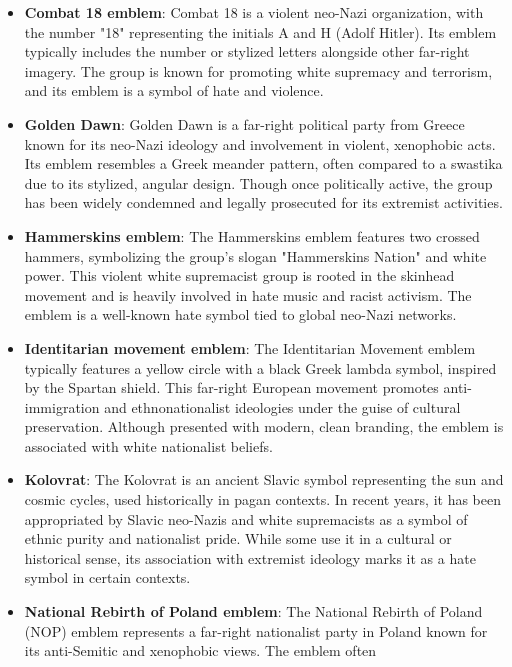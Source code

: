 \begin{itemize}
  symbol, white supremacists have adopted a simplified version as a symbol of white
  identity and nationalism. This version is now widely recognized as a hate symbol
  in extremist contexts.
  \item \textbf{Combat 18 emblem}: Combat 18 is a violent neo-Nazi organization, with the
  number "18" representing the initials A and H (Adolf Hitler). Its emblem typically
  includes the number or stylized letters alongside other far-right imagery. The group
  is known for promoting white supremacy and terrorism, and its emblem is a symbol of
  hate and violence.
  \item \textbf{Golden Dawn}: Golden Dawn is a far-right political party from Greece known for its neo-Nazi ideology
  and involvement in violent, xenophobic acts. Its emblem resembles a Greek meander pattern, often compared to a
  swastika due to its stylized, angular design. Though once politically active, the group has been widely condemned
  and legally prosecuted for its extremist activities.
  \item \textbf{Hammerskins emblem}: The Hammerskins emblem features two crossed hammers, symbolizing the group's
  slogan "Hammerskins Nation" and white power. This violent white supremacist group is rooted in the skinhead
  movement and is heavily involved in hate music and racist activism. The emblem is a well-known hate symbol tied to
  global neo-Nazi networks.
  \item \textbf{Identitarian movement emblem}: The Identitarian Movement emblem typically features a yellow circle
  with a black Greek lambda symbol, inspired by the Spartan shield. This far-right European movement promotes
  anti-immigration and ethnonationalist ideologies under the guise of cultural preservation. Although presented with
  modern, clean branding, the emblem is associated with white nationalist beliefs.
  \item \textbf{Kolovrat}: The Kolovrat is an ancient Slavic symbol representing the sun and cosmic cycles, used
  historically in pagan contexts. In recent years, it has been appropriated by Slavic neo-Nazis and white
  supremacists as a symbol of ethnic purity and nationalist pride. While some use it in a cultural or historical
  sense, its association with extremist ideology marks it as a hate symbol in certain contexts.
  \item \textbf{National Rebirth of Poland emblem}: The National Rebirth of Poland (NOP) emblem represents a
  far-right nationalist party in Poland known for its anti-Semitic and xenophobic views. The emblem often

\end{itemize}
